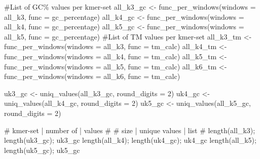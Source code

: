 \documentclass[
  letterpaper,
]{article}
\newenvironment{Shaded}{\begin{snugshade}}{\end{snugshade}}
\newcommand{\AttributeTok}[1]{\textcolor[rgb]{0.40,0.45,0.13}{#1}}
\newcommand{\CommentTok}[1]{\textcolor[rgb]{0.37,0.37,0.37}{#1}}
\newcommand{\DecValTok}[1]{\textcolor[rgb]{0.68,0.00,0.00}{#1}}
\newcommand{\FunctionTok}[1]{\textcolor[rgb]{0.28,0.35,0.67}{#1}}
\newcommand{\NormalTok}[1]{\textcolor[rgb]{0.00,0.23,0.31}{#1}}
\newcommand{\OtherTok}[1]{\textcolor[rgb]{0.00,0.23,0.31}{#1}}
\begin{document}
\begin{Shaded}
\begin{Highlighting}[]
\CommentTok{\#List of GC\% values per kmer{-}set}
\NormalTok{all\_k3\_gc }\OtherTok{\textless{}{-}} \FunctionTok{func\_per\_windows}\NormalTok{(}\AttributeTok{windows =}\NormalTok{ all\_k3,}
                              \AttributeTok{func =}\NormalTok{ gc\_percentage)}
\NormalTok{all\_k4\_gc }\OtherTok{\textless{}{-}} \FunctionTok{func\_per\_windows}\NormalTok{(}\AttributeTok{windows =}\NormalTok{ all\_k4,}
                              \AttributeTok{func =}\NormalTok{ gc\_percentage)}
\NormalTok{all\_k5\_gc }\OtherTok{\textless{}{-}} \FunctionTok{func\_per\_windows}\NormalTok{(}\AttributeTok{windows =}\NormalTok{ all\_k5,}
                              \AttributeTok{func =}\NormalTok{ gc\_percentage)}
\CommentTok{\#List of TM values per kmer{-}set}
\NormalTok{all\_k3\_tm }\OtherTok{\textless{}{-}} \FunctionTok{func\_per\_windows}\NormalTok{(}\AttributeTok{windows =}\NormalTok{ all\_k3,}
                              \AttributeTok{func =}\NormalTok{ tm\_calc)}
\NormalTok{all\_k4\_tm }\OtherTok{\textless{}{-}} \FunctionTok{func\_per\_windows}\NormalTok{(}\AttributeTok{windows =}\NormalTok{ all\_k4,}
                              \AttributeTok{func =}\NormalTok{ tm\_calc)}
\NormalTok{all\_k5\_tm }\OtherTok{\textless{}{-}} \FunctionTok{func\_per\_windows}\NormalTok{(}\AttributeTok{windows =}\NormalTok{ all\_k5,}
                              \AttributeTok{func =}\NormalTok{ tm\_calc)}
\NormalTok{all\_k6\_tm }\OtherTok{\textless{}{-}} \FunctionTok{func\_per\_windows}\NormalTok{(}\AttributeTok{windows =}\NormalTok{ all\_k6,}
                              \AttributeTok{func =}\NormalTok{ tm\_calc)}
\end{Highlighting}
\end{Shaded}

\vspace{0.2cm}

\begin{Shaded}
\begin{Highlighting}[]
\NormalTok{uk3\_gc }\OtherTok{\textless{}{-}} \FunctionTok{uniq\_values}\NormalTok{(all\_k3\_gc, }\AttributeTok{round\_digits =} \DecValTok{2}\NormalTok{)}
\NormalTok{uk4\_gc }\OtherTok{\textless{}{-}} \FunctionTok{uniq\_values}\NormalTok{(all\_k4\_gc, }\AttributeTok{round\_digits =} \DecValTok{2}\NormalTok{)}
\NormalTok{uk5\_gc }\OtherTok{\textless{}{-}} \FunctionTok{uniq\_values}\NormalTok{(all\_k5\_gc, }\AttributeTok{round\_digits =} \DecValTok{2}\NormalTok{)}
    
\CommentTok{\# kmer{-}set    | number of     | values \#}
\CommentTok{\# size        | unique values | list   \#}
\FunctionTok{length}\NormalTok{(all\_k3); }\FunctionTok{length}\NormalTok{(uk3\_gc); uk3\_gc}
\FunctionTok{length}\NormalTok{(all\_k4); }\FunctionTok{length}\NormalTok{(uk4\_gc); uk4\_gc}
\FunctionTok{length}\NormalTok{(all\_k5); }\FunctionTok{length}\NormalTok{(uk5\_gc); uk5\_gc}
\end{Highlighting}
\end{Shaded}
\end{document}

